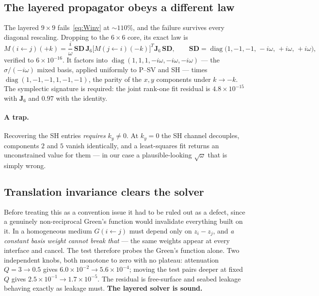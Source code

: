 \documentclass[11pt,a4paper]{article}
\newcommand{\bJ}{\mathbf{J}}
\newcommand{\bD}{\mathbf{D}}
\newcommand{\bS}{\mathbf{S}}
\begin{document}
\subsection{The layered propagator obeys a different law}

The layered $9\times9$ fails~\eqref{eq:Winv} at ${\sim}110\%$, and the failure
survives every diagonal rescaling.  Dropping to the $6\times6$ core, its exact
law is
\begin{equation}\label{eq:gateD}
  M(i\!\leftarrow\! j)(+k)
  = \frac{i}{\omega}\,\bS\bD\,
    \bJ_6 \bigl[M(j\!\leftarrow\! i)(-k)\bigr]^{T}\!\bJ_6\,\bS\bD,
  \qquad
  \bS\bD = \operatorname{diag}\bigl(1,-1,-1,\,-i\omega,\,+i\omega,\,+i\omega\bigr),
\end{equation}
verified to $6\times10^{-16}$.  It factors into
$\operatorname{diag}(1,1,1,-i\omega,-i\omega,-i\omega)$ --- the
$\sigma/(-i\omega)$ mixed basis, applied uniformly to P--SV and SH --- times
$\operatorname{diag}(1,-1,-1,1,-1,-1)$, the parity of the $x,y$ components
under $k\to-k$.  The symplectic signature is required: the joint rank-one fit
residual is $4.8\times10^{-15}$ with $\bJ_6$ and $0.97$ with the identity.

\paragraph{A trap.}  Recovering the SH entries \emph{requires} $k_y\neq0$.  At
$k_y=0$ the SH channel decouples, components $2$ and $5$ vanish identically,
and a least-squares fit returns an unconstrained value for them --- in our case
a plausible-looking $\sqrt{\omega}$ that is simply wrong.

\subsection{Translation invariance clears the solver}

Before treating this as a convention issue it had to be ruled out as a defect,
since a genuinely non-reciprocal Green's function would invalidate everything
built on it.  In a homogeneous medium $G(i\!\leftarrow\! j)$ must depend only
on $z_i - z_j$, and \emph{a constant basis weight cannot break that} --- the
same weights appear at every interface and cancel.  The test therefore probes
the Green's function alone.  Two independent knobs, both monotone to zero with
no plateau: attenuation $Q = 3\to0.5$ gives $6.0\times10^{-2}\to
5.6\times10^{-4}$; moving the test pairs deeper at fixed $Q$ gives
$2.5\times10^{-1}\to1.7\times10^{-5}$.  The residual is free-surface and seabed
leakage behaving exactly as leakage must.  \textbf{The layered solver is
sound.}
\end{document}
